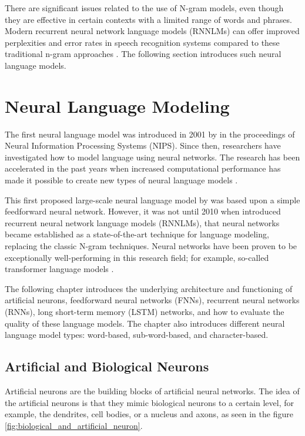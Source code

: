 There are significant issues related to the use of N-gram models, even though they are effective in certain contexts with a limited range of words and phrases. Modern recurrent neural network language models (RNNLMs) can offer improved perplexities and error rates in speech recognition systems compared to these traditional n-gram approaches \parencite{mikolov2010recurrent,mikolov2011extensions,adel2013recurrent,adel2014comparing}. The following section introduces such neural language models.


\chapter{Neural Language Modeling}
\label{cha:Neural_Language_Modeling}

The first neural language model was introduced in 2001 by \citeauthor{bengio2003neural} in the proceedings of Neural Information Processing Systems (NIPS). Since then, researchers have investigated how to model language using neural networks. The research has been accelerated in the past years when increased computational performance has made it possible to create new types of neural language models \parencite{you2019large,chen2014efficient}. 

This first proposed large-scale neural language model by \textcite{bengio2003neural} was based upon a simple feedforward neural network. However, it was not until 2010 when \citeauthor{mikolov2010recurrent} introduced recurrent neural network language models (RNNLMs), that neural networks became established as a state-of-the-art technique for language modeling, replacing the classic N-gram techniques. Neural networks have been proven to be exceptionally well-performing in this research field; for example, so-called transformer language models \parencite{radford2019language,devlin2018bert,krause2019dynamic}. 

The following chapter introduces the underlying architecture and functioning of artificial neurons, feedforward neural networks (FNNs), recurrent neural networks (RNNs), long short-term memory (LSTM) networks, and how to evaluate the quality of these language models. The chapter also introduces different neural language model types: word-based, sub-word-based, and character-based.


\section{Artificial and Biological Neurons}
\label{sec:Artificial_and_Biological_Neurons}
Artificial neurons are the building blocks of artificial neural networks. The idea of the artificial neurons is that they mimic biological neurons to a certain level, for example, the dendrites, cell bodies, or a nucleus and axons, as seen in the figure \ref{fig:biological_and_artificial_neuron}. 

